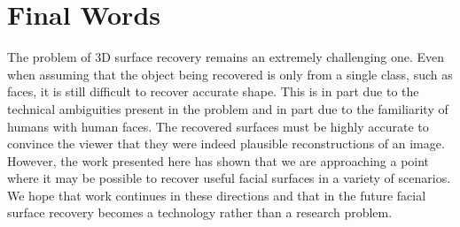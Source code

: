 \section{Final Words}
The problem of 3D surface recovery remains an extremely challenging one. Even
when assuming that the object being recovered is only from a single class,
such as faces, it is still difficult to recover accurate shape. This is in
part due to the technical ambiguities present in the problem and in part
due to the familiarity of humans with human faces. The recovered surfaces must
be highly accurate to convince the viewer that they were indeed plausible
reconstructions of an image. However, the work presented here has shown that
we are approaching a point where it may be possible to recover useful facial
surfaces in a variety of scenarios. We hope that work continues in these
directions and that in the future facial surface recovery becomes a technology
rather than a research problem.
\stopcontents[chapters]
